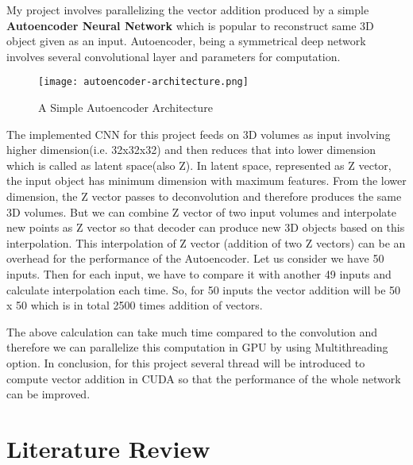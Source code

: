 \documentclass[11pt]{article}       %
\begin{document}
My project involves parallelizing the vector addition produced by a simple \textbf{Autoencoder Neural Network}  which is popular to reconstruct same 3D object given as an input. Autoencoder, being a symmetrical deep network involves several convolutional layer and parameters for computation.
\begin{figure}[h]
\begin{center}
\texttt{[image: autoencoder-architecture.png]}
\caption{A Simple Autoencoder Architecture}
\end{center}
\end{figure}
The implemented CNN for this project feeds on 3D volumes as input involving higher dimension(i.e. 32x32x32) and then reduces that into lower dimension \cite{dr8} which is called as latent space(also Z). In latent space, represented as Z vector, the input object has minimum dimension with maximum features. From the lower dimension, the Z vector passes to deconvolution and therefore produces the same 3D volumes. But we can combine Z vector of two input volumes and interpolate new points as Z vector so that decoder can produce new 3D objects based on this interpolation. This interpolation of Z vector (addition of two Z vectors) can be an overhead for the performance of the Autoencoder. Let us consider we have 50 inputs. Then for each input, we have to compare it with another 49 inputs and calculate interpolation each time. So, for 50 inputs the vector addition will be 50 x 50 which is in total 2500 times addition of vectors.

The above calculation can take much time compared to the convolution and therefore we can parallelize this computation in GPU by using Multithreading option. In conclusion, for this project several thread will be introduced to compute vector addition in CUDA so that the performance of the whole network can be improved.    
 

\section{Literature Review} \label{litrev}
\end{document}
